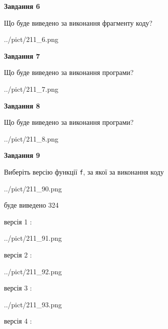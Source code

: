 \documentclass[12pt, ukrainian]{article}
\def\code#1{\Verb!#1!}
\begin{document}
{\begin {large}
{\begin {center}\textbf{Завдання 6}\end {center}}

Що буде виведено за виконання фрагменту коду?\par
\begin{center}
	{../pict/211_6.png}
\end{center}
\newpage

{\begin {center}\textbf{Завдання 7}\end {center}}

Що буде виведено за виконання програми?\par
\begin{center}
	{../pict/211_7.png}
\end{center}
\newpage

{\begin {center}\textbf{Завдання 8}\end {center}}

Що буде виведено за виконання програми?\par
\begin{center}
	{../pict/211_8.png}
\end{center}
\newpage

{\begin {center}\textbf{Завдання 9}\end {center}}

Виберіть версію функції \code{f}, за якої за виконання коду
\begin{center}
	{../pict/211_90.png}
\end{center}
буде виведено 324

\vspace{5mm}
версія 1 :

\begin{center}
	{../pict/211_91.png}
\end{center}
версія 2 :

\begin{center}
	{../pict/211_92.png}
\end{center}
версія 3 :

\begin{center}
	{../pict/211_93.png}
\end{center}
версія 4 :


\end{large}}
\end{document}
